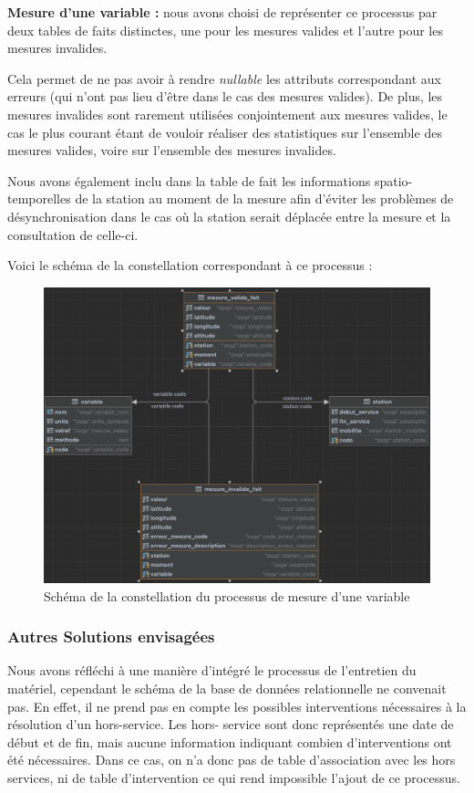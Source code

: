 \documentclass{article}
\begin{document}
\textbf{Mesure d'une variable :} nous avons choisi de représenter ce processus
par deux tables de faits distinctes, une pour les mesures valides et l'autre pour
les mesures invalides. 

Cela permet de ne pas avoir à rendre \textit{nullable} les attributs correspondant
aux erreurs (qui n'ont pas lieu d'être dans le cas des mesures valides). De plus,
les mesures invalides sont rarement utilisées conjointement aux mesures valides,
le cas le plus courant étant de vouloir réaliser des statistiques sur l'ensemble
des mesures valides, voire sur l'ensemble des mesures invalides.

Nous avons également inclu dans la table de fait les informations spatio-temporelles
de la station au moment de la mesure afin d'éviter les problèmes de désynchronisation
dans le cas où la station serait déplacée entre la mesure et la consultation de celle-ci.

Voici le schéma de la constellation correspondant à ce processus :

\begin{figure}[ht]
\centering
\includegraphics[scale=0.3]{mesure_fait.png}
\caption{Schéma de la constellation du processus de mesure d'une variable}
\end{figure}

\vspace{30cm}
\subsubsection*{Autres Solutions envisagées}
Nous avons réfléchi à une manière d'intégré le processus de l'entretien
du matériel, cependant le schéma de la base de données relationnelle
ne convenait pas. En effet, il ne prend pas en compte les possibles 
interventions nécessaires à la résolution d'un hors-service. Les hors-
service sont donc représentés une date de début et de fin, 
mais aucune information indiquant combien d'interventions ont été nécessaires. 
Dans ce cas, on n'a donc pas de table d'association avec les hors services, 
ni de table d'intervention ce qui rend impossible l'ajout de ce processus.
\end{document}
